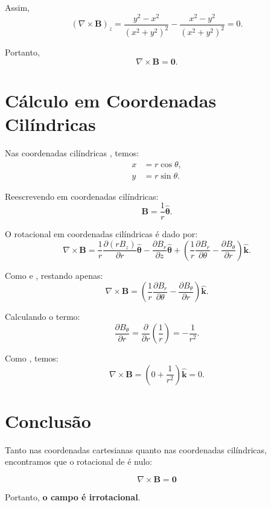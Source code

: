 \documentclass[a4paper,12pt]{article}
\begin{document}
\begin{flushleft}
Assim,
\begin{equation}
\left(\nabla \times \mathbf{B} \right)_z = \frac{y^2 - x^2}{(x^2 + y^2)^2} - \frac{x^2 - y^2}{(x^2 + y^2)^2} = 0.
\end{equation}

Portanto,
\begin{equation}
\boxed{ \nabla \times \mathbf{B} = \mathbf{0}.}
\end{equation}

\section*{Cálculo em Coordenadas Cilíndricas}

Nas coordenadas cilíndricas , temos:
\begin{align}
x &= r \cos\theta, \\
y &= r \sin\theta.
\end{align}

Reescrevendo  em coordenadas cilíndricas:
\begin{equation}
\mathbf{B} = \frac{1}{r} \hat{\bm{\theta}}.
\end{equation}

O rotacional em coordenadas cilíndricas é dado por:
\begin{equation}
\nabla \times \mathbf{B} = \frac{1}{r} \frac{\partial (r B_z)}{\partial r} \hat{\bm{\theta}} - \frac{\partial B_r}{\partial z} \hat{\bm{\theta}} + \left( \frac{1}{r} \frac{\partial B_r}{\partial \theta} - \frac{\partial B_\theta}{\partial r} \right) \hat{\mathbf{k}}.
\end{equation}

Como  e , restando apenas:
\begin{equation}
\nabla \times \mathbf{B} = \left( \frac{1}{r} \frac{\partial B_r}{\partial \theta} - \frac{\partial B_\theta}{\partial r} \right) \hat{\mathbf{k}}.
\end{equation}

Calculando o termo:
\begin{equation}
\frac{\partial B_\theta}{\partial r} = \frac{\partial}{\partial r} \left( \frac{1}{r} \right) = -\frac{1}{r^2}.
\end{equation}

Como , temos:
\begin{equation}
\nabla \times \mathbf{B} = \left( 0 + \frac{1}{r^2} \right) \hat{\mathbf{k}} = 0.
\end{equation}

\section*{Conclusão}

Tanto nas coordenadas cartesianas quanto nas coordenadas cilíndricas, encontramos que o rotacional de  é nulo:

\begin{equation}
\boxed{\nabla \times \mathbf{B} = \mathbf{0}}
\end{equation}

Portanto, \colorbox{green!20}{\textbf{o campo é irrotacional}.}

\end{flushleft}
    
\end{document}
